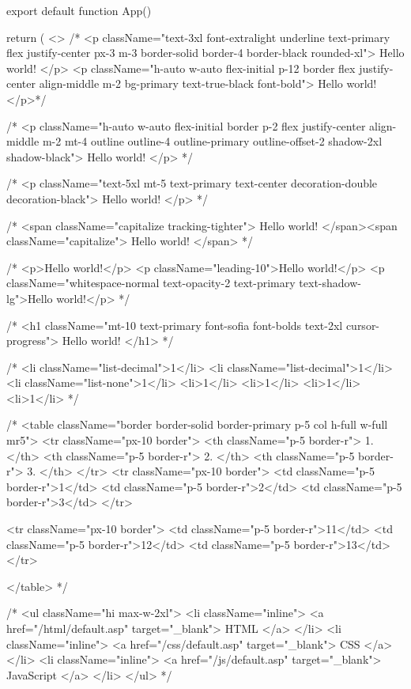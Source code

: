 export default function App() {
  return (
    <>
      {/* <p className="text-3xl font-extralight underline text-primary flex justify-center px-3 m-3 border-solid border-4 border-black rounded-xl">
        Hello world!
      </p>
      <p className="h-auto w-auto flex-initial p-12 border flex justify-center align-middle m-2 bg-primary text-true-black font-bold">
        Hello world!
      </p>*/}

      {/* <p className="h-auto w-auto flex-initial border p-2 flex justify-center align-middle m-2 mt-4 outline outline-4 outline-primary outline-offset-2 shadow-2xl shadow-black">
        Hello world!
      </p>  */}

      {/* <p className="text-5xl mt-5 text-primary text-center decoration-double decoration-black">
        Hello world!
      </p> */}

      {/* <span className="capitalize tracking-tighter">
        Hello world!
      </span><span className="capitalize">
        Hello world!
      </span> */}

      {/* <p>Hello world!</p>
      <p className="leading-10">Hello world!</p>
      <p className="whitespace-normal text-opacity-2 text-primary text-shadow-lg">Hello world!</p> */}

      {/* <h1 className="mt-10  text-primary font-sofia font-bolds text-2xl cursor-progress">
        Hello world!
      </h1> */}

      {/* <li className="list-decimal">1</li>
      <li className="list-decimal">1</li>
      <li className="list-none">1</li>
      <li>1</li>
      <li>1</li>
      <li>1</li>
      <li>1</li> */}

      {/* <table className="border border-solid border-primary p-5 col h-full w-full mr5"> 
        <tr className="px-10 border">
        <th className="p-5 border-r">
          1.
        </th>
        <th className="p-5 border-r">
          2.
        </th>
        <th className="p-5 border-r">
          3.
        </th>
        </tr>
        <tr className="px-10 border">
        <td className="p-5 border-r">1</td>
        <td className="p-5 border-r">2</td>
        <td className="p-5 border-r">3</td>
        </tr>

        <tr className="px-10 border">
        <td className="p-5 border-r">11</td>
        <td className="p-5 border-r">12</td>
        <td className="p-5 border-r">13</td>
        </tr>
        
      </table> */}

      {/* <ul className="hi max-w-2xl">
        <li className="inline">
          <a href="/html/default.asp" target="_blank">
            HTML
          </a>
        </li>
        <li className="inline">
          <a href="/css/default.asp" target="_blank">
            CSS
          </a>
        </li>
        <li className="inline">
          <a href="/js/default.asp" target="_blank">
            JavaScript
          </a>
        </li>
      </ul> */}

}
